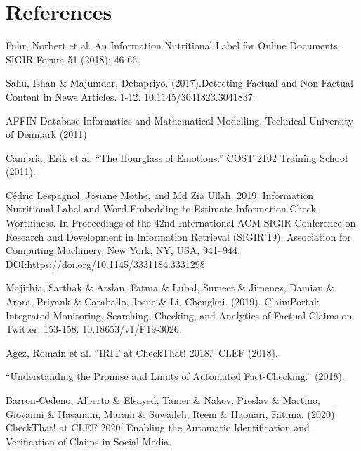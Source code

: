 \documentclass[10pt]{article}
\begin{document}
\section{References}
\begin{enumerate}[label={[\arabic*]}]
\item Fuhr, Norbert et al. \grqq{}An Information Nutritional Label for Online Documents.\grqq{} SIGIR Forum 51 (2018): 46-66.\label{[1]}
\item Sahu, Ishan \& Majumdar, Debapriyo. (2017).Detecting Factual and Non-Factual Content in News Articles. 1-12. 10.1145/3041823.3041837.\label{[2]}
\item AFFIN Database Informatics and Mathematical Modelling, Technical University of Denmark (2011) \label{[3]}
\item Cambria, Erik et al. “The Hourglass of Emotions.” COST 2102 Training School (2011). \label{[4]}
\item Cédric Lespagnol, Josiane Mothe, and Md Zia Ullah. 2019. Information Nutritional Label and Word Embedding to Estimate Information Check-Worthiness. In Proceedings of the 42nd International ACM SIGIR Conference on Research and Development in Information Retrieval (SIGIR’19). Association for Computing Machinery, New York, NY, USA, 941–944. DOI:https://doi.org/10.1145/3331184.3331298 \label{[5]}
\item Majithia, Sarthak \& Arslan, Fatma \& Lubal, Sumeet \& Jimenez, Damian \& Arora, Priyank \& Caraballo, Josue \& Li, Chengkai. (2019). ClaimPortal: Integrated Monitoring, Searching, Checking, and Analytics of Factual Claims on Twitter. 153-158. 10.18653/v1/P19-3026. \label{[6]}
\item Agez, Romain et al. “IRIT at CheckThat! 2018.” CLEF (2018). \label{[7]}
\item “Understanding the Promise and Limits of Automated Fact-Checking.” (2018). \label{[8]}
\item Barron-Cedeno, Alberto \& Elsayed, Tamer \& Nakov, Preslav \& Martino, Giovanni \& Hasanain, Maram \& Suwaileh, Reem \& Haouari, Fatima. (2020). CheckThat! at CLEF 2020: Enabling the Automatic Identification and Verification of Claims in Social Media. \label{[9]}


\end{enumerate}
\end{document}
